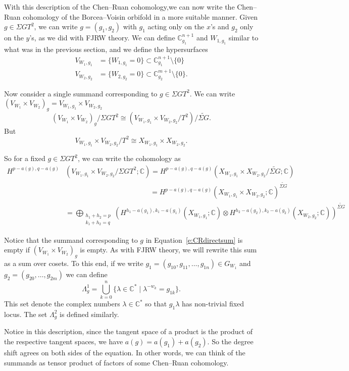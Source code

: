 \documentclass[10pt, letterpaper]{amsart}
\theoremstyle{remark}
\newcommand{\CC}{\mathbb C}
\newcommand{\set}[1]{\{#1\}}
\newcommand{\s}[1]{\Sigma #1}
\begin{document}
With this description of the Chen--Ruan cohomology,we can now write the Chen--Ruan cohomology of the Borcea--Voisin orbifold in a more suitable manner. Given $g\in \s{G}T^2$, we can write $g=(g_1,g_2)$ with $g_1$ acting only on the $x$'s and $g_2$ only on the $y$'s, as we did with FJRW theory. We can define $\CC^{n+1}_{g_1}$ and $W_{1,g_1}$ similar to what was in the previous section, and we define the hypersurfaces
\begin{align*}
V_{W_1,g_1}&=\set{W_{1,g_1}=0}\subset\CC^{n+1}_{g_1}\setminus \set{0}\\
V_{W_2,g_2}&=\set{W_{2,g_2}=0}\subset\CC^{m+1}_{g_2}\setminus \set{0}.
\end{align*}

Now consider a single summand corresponding to $g\in\s{G}T^2$. We can write $(V_{W_1}\times V_{W_2})_g=V_{W_1,g_1}\times V_{W_2,g_2}$
\[
(V_{W_1}\times V_{W_2})_g/\s{G}T^2\cong (V_{W_1,g_1}\times V_{W_2,g_2}/T^2)/\widetilde{\s{G}}.
\]
But 
\[
V_{W_1,g_1}\times V_{W_2,g_2}/T^2\cong X_{W_1,g_1}\times X_{W_2,g_2}.
\]

So for a fixed $g\in \s{G}T^2$, we can write the cohomology as 
\begin{align*}
H^{p-a(g),q-a(g)}&(V_{W_1,g_1}\times V_{W_2,g_2}/\s{G}T^2;\CC) = H^{p-a(g),q-a(g)}(X_{W_1,g_1}\times X_{W_2,g_2}/\widetilde{\s{G}};\CC)\\
	&\qquad\qquad\qquad\qquad\qquad\qquad=H^{p-a(g),q-a(g)}(X_{W_1,g_1}\times X_{W_2,g_2};\CC)^{\widetilde{\s{G}}}\\
	&=\bigoplus_{\substack{h_1+h_2=p\\ k_1+h_2=q}}\left(H^{h_1-a(g_1),k_1-a(g_1)}(X_{W_1,g_1};\CC)\otimes H^{h_2-a(g_2),k_2-a(g_2)}(X_{W_2,g_2};\CC)\right)^{\widetilde{\s{G}}}
\end{align*}

Notice that the summand corresponding to $g$ in Equation~\eqref{e:CRdirectsum} is empty if $(V_{W_1}\times V_{W_2})_{g}$ is empty. As with FJRW theory, we will rewrite this sum as a sum over cosets. To this end, if we write $g_1=(g_{10},g_{11}, \dots, g_{1n})\in G_{W_1}$ and $g_2=(g_{20}, \dots, g_{2m})$ we can define 
\[
\Lambda^1_{g}=\bigcup_{k=0}^n\set{\lambda\in \CC^*\mid\lambda^{-w_k}=g_{1k}}.
\] 
This set denote the complex numbers $\lambda\in \CC^*$ so that $g_1\lambda$ has non-trivial fixed locus. The set $\Lambda^2_{g}$ is defined similarly. 

Notice in this description, since the tangent space of a product is the product of the respective tangent spaces, we have $a(g)=a(g_1)+a(g_2)$. So the degree shift agrees on both sides of the equation. In other words, we can think of the summands as tensor product of factors of some Chen--Ruan cohomology. 
\end{document}
